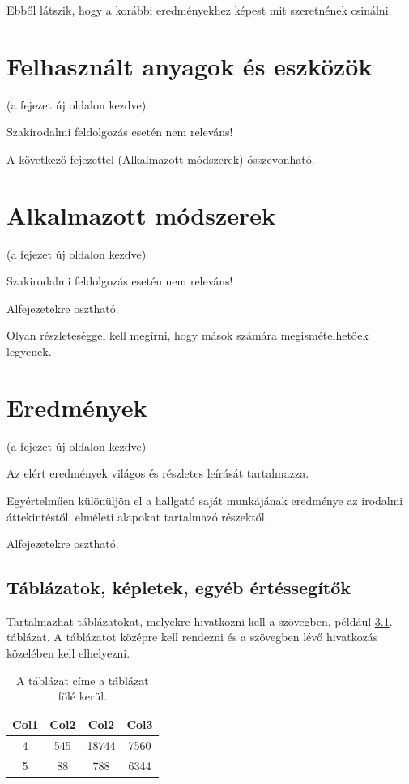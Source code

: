 Ebből látszik, hogy a korábbi eredményekhez képest mit szeretnének csinálni.

\chapter{Felhasznált anyagok és eszközök}

 (a fejezet új oldalon kezdve)

Szakirodalmi feldolgozás esetén nem releváns!

A következő fejezettel (Alkalmazott módszerek) összevonható.

\chapter{Alkalmazott módszerek}

 (a fejezet új oldalon kezdve)

Szakirodalmi feldolgozás esetén nem releváns!

Alfejezetekre osztható.

Olyan részleteséggel kell megírni, hogy mások számára megismételhetőek legyenek.

\chapter{Eredmények}

 (a fejezet új oldalon kezdve)

Az elért eredmények világos és részletes leírását tartalmazza.

Egyértelműen különüljön el a hallgató saját munkájának eredménye az irodalmi áttekintéstől, elméleti alapokat
tartalmazó részektől.

Alfejezetekre osztható.

\section{Táblázatok, képletek, egyéb értéssegítők}

Tartalmazhat táblázatokat, melyekre hivatkozni kell a szövegben, például \ref{table:2}. táblázat. A táblázatot középre
kell rendezni és a szövegben lévő hivatkozás közelében kell elhelyezni.

\begin{table}[h!]
    \centering
    \caption{A táblázat címe a táblázat fölé kerül.}
    \label{table:2}
    \vspace{.2 cm}
    \begin{tabular}{||c c c c||}
        \hline
        Col1 & Col2 & Col2  & Col3 \\ [0.5ex]
        \hline\hline
        4    & 545  & 18744 & 7560 \\
        5    & 88   & 788   & 6344 \\ [1ex]
        \hline
    \end{tabular}
\end{table}

